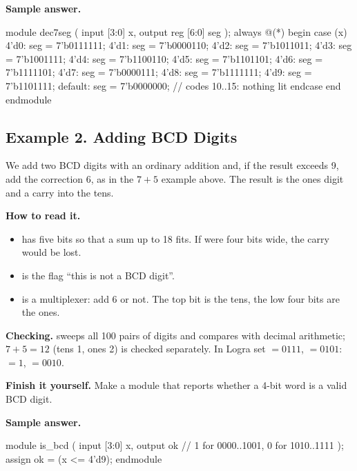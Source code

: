 \textbf{Sample answer.}\par\nopagebreak
\begin{vcode}
module dec7seg (
    input      [3:0] x,
    output reg [6:0] seg
);
    always @(*) begin
        case (x)
            4'd0: seg = 7'b0111111;
            4'd1: seg = 7'b0000110;
            4'd2: seg = 7'b1011011;
            4'd3: seg = 7'b1001111;
            4'd4: seg = 7'b1100110;
            4'd5: seg = 7'b1101101;
            4'd6: seg = 7'b1111101;
            4'd7: seg = 7'b0000111;
            4'd8: seg = 7'b1111111;
            4'd9: seg = 7'b1101111;
            default: seg = 7'b0000000;   // codes 10..15: nothing lit
        endcase
    end
endmodule
\end{vcode}

\subsection{Example 2. Adding BCD Digits}

We add two BCD digits with an ordinary addition and, if the result exceeds 9,
add the correction 6, as in the $7+5$ example above. The result is the ones
digit and a carry into the tens.


\textbf{How to read it.}
\begin{itemize}
  \item {} has five bits so that a sum up to 18 fits. If  were four bits wide, the carry would be lost.
  \item {} is the flag ``this is not a BCD digit''.
  \item {} is a multiplexer: add 6 or not. The top bit  is the tens, the low four bits are the ones.
\end{itemize}
\textbf{Checking.}  sweeps all 100 pairs of digits and
compares with decimal arithmetic; $7+5=12$ (tens 1, ones 2) is checked
separately. In Logra set $=0111$, $=0101$: $=1$,
$=0010$.

\textbf{Finish it yourself.} Make a module that reports whether a 4-bit word is
a valid BCD digit.

\textbf{Sample answer.}\par\nopagebreak
\begin{vcode}
module is_bcd (
    input  [3:0] x,
    output       ok       // 1 for 0000..1001, 0 for 1010..1111
);
    assign ok = (x <= 4'd9);
endmodule
\end{vcode}

